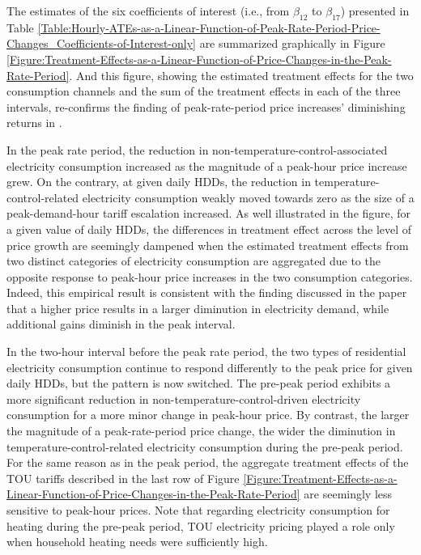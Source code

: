 The estimates of the six coefficients of interest (i.e., from $\beta_{12}$ to $\beta_{17}$) presented in Table \ref{Table:Hourly-ATEs-as-a-Linear-Function-of-Peak-Rate-Period-Price-Changes_Coefficients-of-Interest-only} are summarized graphically in Figure \ref{Figure:Treatment-Effects-as-a-Linear-Function-of-Price-Changes-in-the-Peak-Rate-Period}. And this figure, showing the estimated treatment effects for the two consumption channels and the sum of the treatment effects in each of the three intervals, re-confirms the finding of peak-rate-period price increases' diminishing returns in \cite{Peaking-Interest:How-Awareness-Drives-the-Effectiveness-of-Time-of-Use-Electricity-Pricing_Prest_2020}. 

In the peak rate period, the reduction in non-temperature-control-associated electricity consumption increased as the magnitude of a peak-hour price increase grew. On the contrary, at given daily HDDs, the reduction in temperature-control-related electricity consumption weakly moved towards zero as the size of a peak-demand-hour tariff escalation increased. As well illustrated in the figure, for a given value of daily HDDs, the differences in treatment effect across the level of price growth are seemingly dampened when the estimated treatment effects from two distinct categories of electricity consumption are aggregated due to the opposite response to peak-hour price increases in the two consumption categories. Indeed, this empirical result is consistent with the finding discussed in the paper that a higher price results in a larger diminution in electricity demand, while additional gains diminish in the peak interval.  

In the two-hour interval before the peak rate period, the two types of residential electricity consumption continue to respond differently to the peak price for given daily HDDs, but the pattern is now switched. The pre-peak period exhibits a more significant reduction in non-temperature-control-driven electricity consumption for a more minor change in peak-hour price. By contrast, the larger the magnitude of a peak-rate-period price change, the wider the diminution in temperature-control-related electricity consumption during the pre-peak period. For the same reason as in the peak period, the aggregate treatment effects of the TOU tariffs described in the last row of Figure \ref{Figure:Treatment-Effects-as-a-Linear-Function-of-Price-Changes-in-the-Peak-Rate-Period} are seemingly less sensitive to peak-hour prices. Note that regarding electricity consumption for heating during the pre-peak period, TOU electricity pricing played a role only when household heating needs were sufficiently high. 

